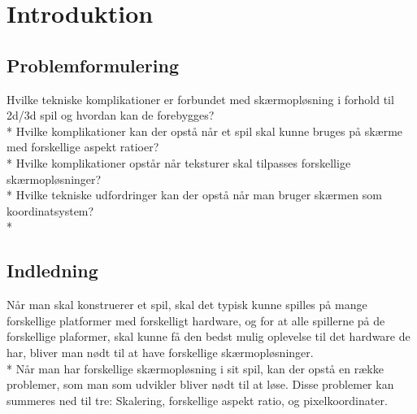 \documentclass[Main.tex]{introduktion}
\begin{document}
\chapter{Introduktion}

			
\section{Problemformulering}
Hvilke tekniske komplikationer er forbundet med skærmopløsning i forhold til 2d/3d spil og hvordan kan de forebygges?\\*
Hvilke komplikationer kan der opstå når et spil skal kunne bruges på skærme med forskellige aspekt ratioer?\\*
Hvilke komplikationer opstår når teksturer skal tilpasses forskellige skærmopløsninger?\\*
Hvilke tekniske udfordringer kan der opstå når man bruger skærmen som koordinatsystem?\\*
		
\section{Indledning}

Når man skal konstruerer et spil, skal det typisk kunne spilles på mange forskellige platformer med forskelligt hardware, og for at alle spillerne på de forskellige plaformer, skal kunne få den bedst mulig oplevelse til det hardware de har, bliver man nødt til at have forskellige skærmopløsninger.\\* 
Når man har forskellige skærmopløsning i sit spil, kan der opstå en række problemer, som man som udvikler bliver nødt til at løse. Disse problemer kan summeres ned til tre: Skalering, forskellige aspekt ratio, og pixelkoordinater.		
	
\end{document}
